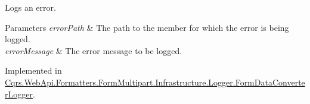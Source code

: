 Logs an error. 


\begin{DoxyParams}{Parameters}
{\em error\+Path} & The path to the member for which the error is being logged.\\
\hline
{\em error\+Message} & The error message to be logged.\\
\hline
\end{DoxyParams}


Implemented in \hyperlink{classCqrs_1_1WebApi_1_1Formatters_1_1FormMultipart_1_1Infrastructure_1_1Logger_1_1FormDataConverterLogger_a72fcac7560a05dfebbff772a4216a5d8}{Cqrs.\+Web\+Api.\+Formatters.\+Form\+Multipart.\+Infrastructure.\+Logger.\+Form\+Data\+Converter\+Logger}.

